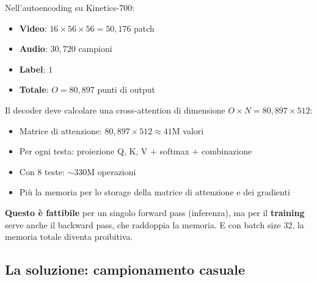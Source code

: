 \documentclass[12pt,a4paper]{article}
\begin{document}
\begin{examplebox}
Nell'autoencoding su Kinetics-700:
\begin{itemize}
    \item \textbf{Video}: $16 \times 56 \times 56 = 50{,}176$ patch
    \item \textbf{Audio}: $30{,}720$ campioni
    \item \textbf{Label}: $1$
    \item \textbf{Totale}: $O = 80{,}897$ punti di output
\end{itemize}

Il decoder deve calcolare una cross-attention di dimensione $O \times N = 80{,}897 \times 512$:
\begin{itemize}
    \item Matrice di attenzione: $80{,}897 \times 512 \approx 41$M valori
    \item Per ogni testa: proiezione Q, K, V + softmax + combinazione
    \item Con 8 teste: $\sim$330M operazioni
    \item Pi\`u la memoria per lo storage della matrice di attenzione e dei gradienti
\end{itemize}

\textbf{Questo \`e fattibile} per un singolo forward pass (inferenza), ma per il \textbf{training} serve anche il backward pass, che raddoppia la memoria. E con batch size 32, la memoria totale diventa proibitiva.
\end{examplebox}

\subsection{La soluzione: campionamento casuale}
\end{document}

